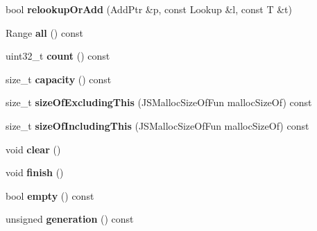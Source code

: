 \begin{DoxyCompactItemize}
\item 
\hypertarget{classjs_1_1_hash_set_a7ec3a0114dd982991a5dc92be39808d5}{bool {\bfseries relookup\-Or\-Add} (Add\-Ptr \&p, const Lookup \&l, const T \&t)}\label{classjs_1_1_hash_set_a7ec3a0114dd982991a5dc92be39808d5}

\item 
\hypertarget{classjs_1_1_hash_set_a92d53ab25ad2caa29319f2a236381b1e}{Range {\bfseries all} () const }\label{classjs_1_1_hash_set_a92d53ab25ad2caa29319f2a236381b1e}

\item 
\hypertarget{classjs_1_1_hash_set_a46ab8791b3eeb07bbe7d850dc5f731d6}{uint32\-\_\-t {\bfseries count} () const }\label{classjs_1_1_hash_set_a46ab8791b3eeb07bbe7d850dc5f731d6}

\item 
\hypertarget{classjs_1_1_hash_set_a9f98aaee411c849fb7372a0b795e6502}{size\-\_\-t {\bfseries capacity} () const }\label{classjs_1_1_hash_set_a9f98aaee411c849fb7372a0b795e6502}

\item 
\hypertarget{classjs_1_1_hash_set_a06891e464c85cec94d825fc06715e40c}{size\-\_\-t {\bfseries size\-Of\-Excluding\-This} (J\-S\-Malloc\-Size\-Of\-Fun malloc\-Size\-Of) const }\label{classjs_1_1_hash_set_a06891e464c85cec94d825fc06715e40c}

\item 
\hypertarget{classjs_1_1_hash_set_abb3f8f4399707daeaa8ad85c0d422811}{size\-\_\-t {\bfseries size\-Of\-Including\-This} (J\-S\-Malloc\-Size\-Of\-Fun malloc\-Size\-Of) const }\label{classjs_1_1_hash_set_abb3f8f4399707daeaa8ad85c0d422811}

\item 
\hypertarget{classjs_1_1_hash_set_a96567177092ffb8d80898c03194e7f64}{void {\bfseries clear} ()}\label{classjs_1_1_hash_set_a96567177092ffb8d80898c03194e7f64}

\item 
\hypertarget{classjs_1_1_hash_set_ac18de70d1014b703894569aaab8432b4}{void {\bfseries finish} ()}\label{classjs_1_1_hash_set_ac18de70d1014b703894569aaab8432b4}

\item 
\hypertarget{classjs_1_1_hash_set_ae5870c6683ef2161166a092ad737f135}{bool {\bfseries empty} () const }\label{classjs_1_1_hash_set_ae5870c6683ef2161166a092ad737f135}

\item 
\hypertarget{classjs_1_1_hash_set_a0e8958f35d9753bcfcb2e1ca151c82b3}{unsigned {\bfseries generation} () const }\label{classjs_1_1_hash_set_a0e8958f35d9753bcfcb2e1ca151c82b3}


\end{DoxyCompactItemize}

